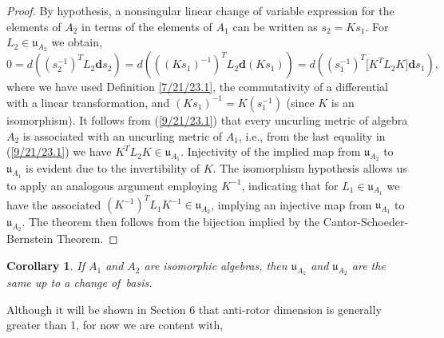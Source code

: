 \documentclass{amsart}
\newtheorem{corollary}[theorem]{Corollary}
\theoremstyle{definition}
\numberwithin{theorem}{section}
\numberwithin{equation}{section}
\begin{document}
\begin{proof} By hypothesis, a nonsingular linear change of variable expression for the elements of $A_2$ in terms of the elements of $A_1$ can be written as $s_2= Ks_1$. \mbox{For $L_2\in \mathfrak{u}_{A_2}$} we obtain, \begin{equation} 0 = d\left((s_2^{-1})^T L_2 \mathbf{d}s_2\right) =  d\left(((Ks_1)^{-1})^T L_2 \mathbf{d}(Ks_1)\right) = d\left((s_1^{-1})^T \big[K^T L_2K\big]\mathbf{d}s_1\right), \label{9/21/23.1}  \end{equation} where we have used Definition \ref{7/21/23.1}, the commutativity of a differential with a linear transformation, and $(Ks_1)^{-1} = K(s_1^{-1})$ (since $K$ is an isomorphism).   It follows from (\ref{9/21/23.1}) that every uncurling metric  of algebra $A_2$ is associated with an uncurling metric of $A_1$, i.e., from the last equality in (\ref{9/21/23.1}) we have  $K^TL_2K\in\mathfrak{u}_{A_1}$. Injectivity of the implied map from $\mathfrak{u}_{A_2}$ to $\mathfrak{u}_{A_1}$ is evident due to the invertibility of $K$.   The isomorphism hypothesis allows us to apply an analogous argument employing $K^{-1}$, indicating that for $L_1\in\mathfrak{u}_{A_1}$ we have the associated $(K^{-1})^T L_1 K^{-1} \in \mathfrak{u}_{A_2}$, implying an injective map from $\mathfrak{u}_{A_1}$ to $\mathfrak{u}_{A_2}$.  The theorem then follows from the bijection implied by the Cantor-Schoeder-Bernstein Theorem. 
\end{proof}

\begin{corollary}\label{7/31/25.1} If $A_1$ and $A_2$ are isomorphic algebras, then $\mathfrak{u}_{A_1}$ and $\mathfrak{u}_{A_2}$ are the same up to a change \mbox{of basis}. \end{corollary}  

Although it will be shown in Section 6 that anti-rotor dimension is generally greater than 1, for now we are content with,       
\end{document}
